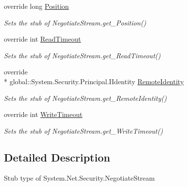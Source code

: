 \begin{DoxyCompactItemize}
override long \hyperlink{class_system_1_1_net_1_1_security_1_1_fakes_1_1_stub_negotiate_stream_acd2c685315bd0920f4b6af9b7fce9118}{Position}
\begin{DoxyCompactList}\small\item\em Sets the stub of Negotiate\-Stream.\-get\-\_\-\-Position()\end{DoxyCompactList}\item 
override int \hyperlink{class_system_1_1_net_1_1_security_1_1_fakes_1_1_stub_negotiate_stream_ac1db99bc5cfccc29173356f0c64a86cd}{Read\-Timeout}
\begin{DoxyCompactList}\small\item\em Sets the stub of Negotiate\-Stream.\-get\-\_\-\-Read\-Timeout()\end{DoxyCompactList}\item 
override \\*
global\-::\-System.\-Security.\-Principal.\-I\-Identity \hyperlink{class_system_1_1_net_1_1_security_1_1_fakes_1_1_stub_negotiate_stream_a056a1180900d06b9e562c6139cb9a200}{Remote\-Identity}
\begin{DoxyCompactList}\small\item\em Sets the stub of Negotiate\-Stream.\-get\-\_\-\-Remote\-Identity()\end{DoxyCompactList}\item 
override int \hyperlink{class_system_1_1_net_1_1_security_1_1_fakes_1_1_stub_negotiate_stream_aa053203616fa3e3aeeca63edccdef3cb}{Write\-Timeout}
\begin{DoxyCompactList}\small\item\em Sets the stub of Negotiate\-Stream.\-get\-\_\-\-Write\-Timeout()\end{DoxyCompactList}\end{DoxyCompactItemize}


\subsection{Detailed Description}
Stub type of System.\-Net.\-Security.\-Negotiate\-Stream



